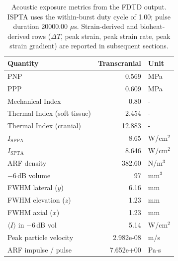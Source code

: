 \documentclass[11pt,letterpaper]{article}
\begin{document}
\begin{table}[h!]
\centering
\scriptsize
\setlength{\tabcolsep}{6pt}
\renewcommand{\arraystretch}{1.05}


\begin{tabular}{l r  l}
\toprule
\textbf{Quantity} & \textbf{Transcranial}  & \textbf{Unit} \\
\midrule
PNP                                  & 0.569        & MPa \\
PPP                                  & 0.609        & MPa \\
Mechanical Index                     & 0.80             & - \\
Thermal Index (soft tissue)          & 2.454        & - \\
Thermal Index (cranial)              & 12.883     & - \\
$I_{\mathrm{SPPA}}$                  & 8.65    & W/cm$^2$ \\
$I_{\mathrm{SPTA}}$                  & 8.646    & W/cm$^2$ \\
ARF density                          & 382.60   & N/m$^3$ \\
$-6$\,dB volume                      & 97 & mm$^3$ \\
FWHM lateral ($y$)                   & 6.16      & mm \\
FWHM elevation ($z$)                 & 1.23      & mm \\
FWHM axial ($x$)                     & 1.23      & mm \\
$\langle I \rangle$ in $-6$\,dB vol  & 5.14   & W/cm$^2$ \\
Peak particle velocity               & 2.982e-08 & m/s \\
ARF impulse / pulse                  & 7.652e+00 & Pa$\cdot$s \\
\bottomrule
\end{tabular}
\caption{Acoustic exposure metrics from the FDTD output.  ISPTA uses the within-burst duty cycle of 1.00; pulse duration 20000.00 $\mu$s.  Strain-derived and bioheat-derived rows ($\Delta T$, peak strain, peak strain rate, peak strain gradient) are reported in subsequent sections.}
\label{tab:acoustic_outputs}
\end{table}
\end{document}
